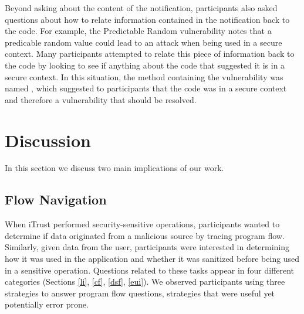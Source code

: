 \documentclass{acm_proc_article-sp}
\begin{document}
Beyond asking about the content of the notification, participants also asked questions about how to relate information contained in the notification back to the code. 
For example, the Predictable Random vulnerability notes that a predicable random value could lead to an attack when being used in a secure context. 
Many participants attempted to relate this piece of information back to the code by looking to see if anything about the code that suggested it is in a secure context. 
In this situation, the method containing the vulnerability was named , which suggested to participants that the code was in a secure context and therefore a vulnerability that should be resolved.


\section{Discussion}
In this section we discuss two main implications of our work.

\subsection{Flow Navigation}
\label{flowNav}
When iTrust performed security-sensitive operations, participants wanted to determine if data originated from a malicious source
by tracing program flow.
Similarly, given data from the user, participants were interested in determining how it was used in the application and whether it was sanitized before being used in a sensitive operation. Questions related to these tasks appear in four different categories (Sections \ref{li}, \ref{cf}, \ref{dsf}, \ref{eui}).
We observed participants using three strategies to answer program flow questions,
strategies that were useful yet potentially error prone.
\end{document}
